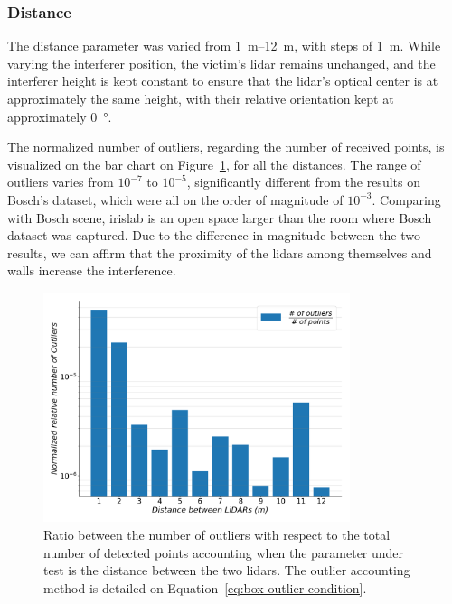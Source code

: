 \subsubsection{Distance}
The distance parameter was varied from \SIrange{1}{12}{\meter}, with steps of \SI{1}{\meter}. While varying the interferer position, the victim's \ac{lidar} remains unchanged, and the interferer height is kept constant to ensure that the \ac{lidar}'s optical center is at approximately the same height, with their relative orientation kept at approximately \SI{0}{\degree}.

The normalized number of outliers, regarding the number of received points, is visualized on the bar chart on Figure~\ref{fig:box-filter-outliers-distance}, for all the distances. The range of outliers varies from $10^{-7}$ to $10^{-5}$, significantly different from the results on Bosch's dataset, which were all on the order of magnitude of $10^{-3}$. Comparing with Bosch scene, \ac{irislab} is an open space larger than the room where Bosch dataset was captured. Due to the difference in magnitude between the two results, we can affirm that the proximity of the \acp{lidar} among themselves and walls increase the interference. 

\begin{figure}[!ht]
\centering
\includegraphics[width=0.8\textwidth]{img/lidar-interference/box-filtering/interference-box-filter-outliers-distance.png}
\caption[Relative number of outliers when the distance between the \acp{lidar} is varied on \ac{irislab}.]{Ratio between the number of outliers with respect to the total number of detected points accounting when the parameter under test is the distance between the two \acp{lidar}. The outlier accounting method is detailed on Equation~\eqref{eq:box-outlier-condition}.}
\label{fig:box-filter-outliers-distance}
\end{figure}

